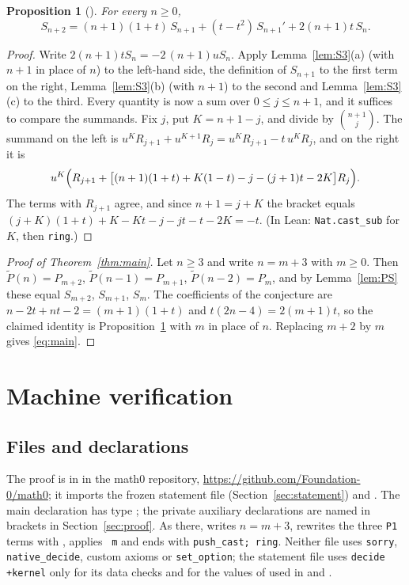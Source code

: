 \documentclass[11pt]{amsart}
\theoremstyle{plain}
\newtheorem{proposition}[theorem]{Proposition}
\theoremstyle{definition}
\newcommand{\tP}{\widetilde P}
\begin{document}
\begin{proposition}[]\label{prop:Srec}
For every $n\ge0$,
\[
  S_{n+2}=(n+1)(1+t)\,S_{n+1}+(t-t^2)\,S_{n+1}'+2(n+1)t\,S_n .
\]
\end{proposition}

\begin{proof}
Write $2(n+1)tS_n=-2\,(n+1)uS_n$. Apply Lemma~\ref{lem:S3}(a) (with $n+1$ in place of $n$) to the left-hand side, the definition of $S_{n+1}$ to the first term on the right, Lemma~\ref{lem:S3}(b) (with $n+1$) to the second and Lemma~\ref{lem:S3}(c) to the third. Every quantity is now a sum over $0\le j\le n+1$, and it suffices to compare the summands. Fix $j$, put $K=n+1-j$, and divide by $\binom{n+1}{j}$. The summand on the left is $u^KR_{j+1}+u^{K+1}R_j=u^KR_{j+1}-t\,u^KR_j$, and on the right it is
\[
  u^K\Bigl(R_{j+1}+\bigl[(n+1)(1+t)+K(1-t)-j-(j+1)t-2K\bigr]R_j\Bigr).
\]
The terms with $R_{j+1}$ agree, and since $n+1=j+K$ the bracket equals $(j+K)(1+t)+K-Kt-j-jt-t-2K=-t$. (In Lean: \texttt{Nat.cast\_sub} for $K$, then \texttt{ring}.)
\end{proof}

\begin{proof}[Proof of Theorem~\ref{thm:main}]
Let $n\ge3$ and write $n=m+3$ with $m\ge0$. Then $\tP(n)=P_{m+2}$, $\tP(n-1)=P_{m+1}$, $\tP(n-2)=P_m$, and by Lemma~\ref{lem:PS} these equal $S_{m+2}$, $S_{m+1}$, $S_m$. The coefficients of the conjecture are $n-2t+nt-2=(m+1)(1+t)$ and $t(2n-4)=2(m+1)t$, so the claimed identity is Proposition~\ref{prop:Srec} with $m$ in place of $n$. Replacing $m+2$ by $m$ gives \eqref{eq:main}.
\end{proof}

\section{Machine verification}\label{sec:lean}

\subsection*{Files and declarations}
The proof is in  in the math0 repository, \url{https://github.com/Foundation-0/math0}; it imports the frozen statement file (Section~\ref{sec:statement}) and . The main declaration  has type ; the private auxiliary declarations are named in brackets in Section~\ref{sec:proof}. As there,  writes $n=m+3$, rewrites the three \texttt{P1} terms with , applies ~\texttt{m} and ends with \texttt{push\_cast; ring}. Neither file uses \texttt{sorry}, \texttt{native\_decide}, custom axioms or \texttt{set\_option}; the statement file uses \texttt{decide +kernel} only for its data checks and for the values of  used in  and .
\end{document}

